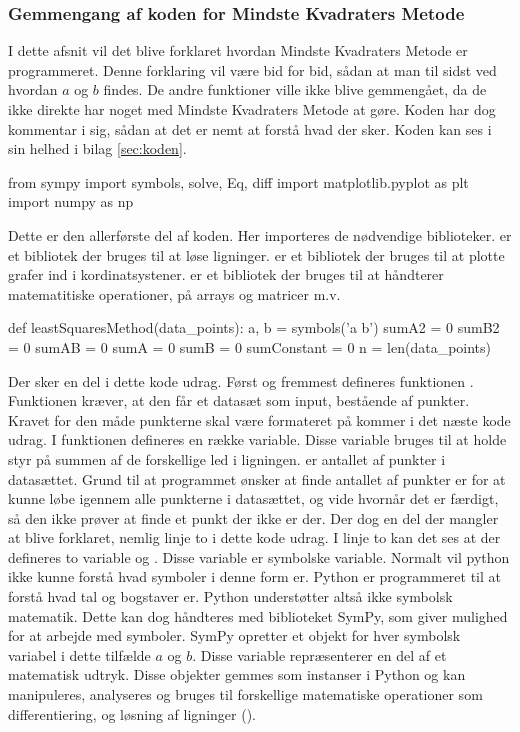 \subsubsection{Gemmengang af koden for Mindste Kvadraters Metode}
I dette afsnit vil det blive forklaret hvordan Mindste Kvadraters Metode er programmeret. Denne forklaring vil være bid for bid, sådan at man til sidst ved hvordan $a$ og $b$ findes. De andre funktioner ville ikke blive gemmengået, da de ikke direkte har noget med Mindste Kvadraters Metode at gøre. Koden har dog kommentar i sig, sådan at det er nemt at forstå hvad der sker. Koden kan ses i sin helhed i bilag \ref{sec:koden}.
\begin{python}
    from sympy import symbols, solve, Eq, diff
    import matplotlib.pyplot as plt
    import numpy as np 
\end{python}
Dette er den allerførste del af koden. Her importeres de nødvendige biblioteker.  er et bibliotek der bruges til at løse ligninger.  er et bibliotek der bruges til at plotte grafer ind i kordinatsystener.  er et bibliotek der bruges til at håndterer matematitiske operationer, på arrays og matricer m.v. 
\begin{python}
    def leastSquaresMethod(data_points):
        a, b = symbols('a b')
        sumA2 = 0
        sumB2 = 0
        sumAB = 0
        sumA = 0
        sumB = 0 
        sumConstant = 0
        n = len(data_points)
\end{python}
Der sker en del i dette kode udrag. Først og fremmest defineres funktionen . Funktionen kræver, at den får et datasæt som input, bestående af punkter. Kravet for den måde punkterne skal være formateret på kommer i det næste kode udrag. I funktionen defineres en række variable. Disse variable bruges til at holde styr på summen af de forskellige led i ligningen.  er antallet af punkter i datasættet. Grund til at programmet ønsker at finde antallet af punkter er for at kunne løbe igennem alle punkterne i datasættet, og vide hvornår det er færdigt, så den ikke prøver at finde et punkt der ikke er der. Der dog en del der mangler at blive forklaret, nemlig linje to i dette kode udrag. I linje to kan det ses at der defineres to variable  og . Disse variable er symbolske variable. Normalt vil python ikke kunne forstå hvad symboler i denne form er. Python er programmeret til at forstå hvad tal og bogstaver er. Python understøtter altså ikke symbolsk matematik. Dette kan dog håndteres med biblioteket SymPy, som giver mulighed for at arbejde med symboler. SymPy opretter et objekt for hver symbolsk variabel i dette tilfælde $a$ og $b$. Disse variable repræsenterer en del af et matematisk udtryk. Disse objekter gemmes som instanser i Python og kan manipuleres, analyseres og bruges til forskellige matematiske operationer som differentiering, og løsning af ligninger (\cite{matematiskeSymboler}).
